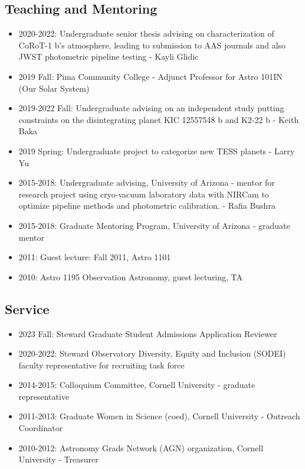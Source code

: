 \documentclass[11pt, oneside]{article}   	%
\begin{document}
\subsection*{Teaching and Mentoring}
\begin{itemize}[noitemsep]
    \item 2020-2022: Undergraduate senior thesis advising on characterization of CoRoT-1 b's atmosphere, leading to submission to AAS journals and also JWST photometric pipeline testing - Kayli Glidic
    \item 2019 Fall: Pima Community College - Adjunct Professor for Astro 101IN (Our Solar System)
    \item 2019-2022 Fall: Undergraduate advising on an independent study putting constraints on the disintegrating planet KIC 12557548 b and K2-22 b - Keith Baka
    \item 2019 Spring: Undergraduate project to categorize new TESS planets - Larry Yu
    \item 2015-2018: Undergraduate advising, University of Arizona - mentor for research project using cryo-vacuum laboratory data with NIRCam to optimize pipeline methods and photometric calibration. - Rafia Bushra
    \item 2015-2018: Graduate Mentoring Program, University of Arizona - graduate mentor
    \item 2011: Guest lecture: Fall 2011, Astro 1101
    \item 2010: Astro 1195 Observation Astronomy, guest lecturing, TA
\end{itemize}

\subsection*{Service}
\begin{itemize}[noitemsep]
    \item 2023 Fall: Steward Graduate Student Admissions Application Reviewer
    \item 2020-2022: Steward Observatory Diversity, Equity and Inclusion (SODEI) faculty representative for recruiting task force
    \item 2014-2015: Colloquium Committee, Cornell University - graduate representative
    \item 2011-2013: Graduate Women in Science (coed), Cornell University - Outreach Coordinator
    \item2010-2012: Astronomy Grads Network (AGN) organization, Cornell University - Treasurer
\end{itemize}


\end{document}
